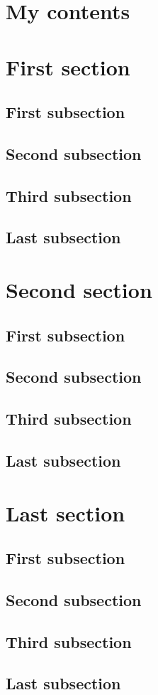 \documentclass{article}
\makeatletter
\renewcommand{\tableofcontents}{\@starttoc{toc}}
\makeatother
\begin{document}
\section*{My contents}

\begin{multicols}{2}
  \tableofcontents
\end{multicols}


\section{First section}%
	\subsection{First subsection}%
	\subsection{Second subsection}%
	\subsection{Third subsection}%
	\subsection{Last subsection}%

\section{Second section}%
	\subsection{First subsection}%
	\subsection{Second subsection}%
	\subsection{Third subsection}%
	\subsection{Last subsection}%

\section{Last section}%
	\subsection{First subsection}%
	\subsection{Second subsection}%
	\subsection{Third subsection}%
	\subsection{Last subsection}%
\end{document}
